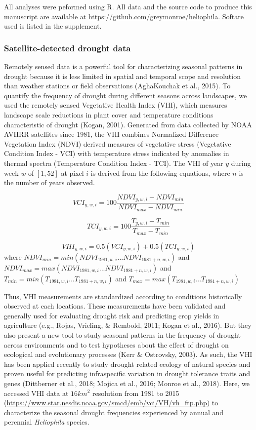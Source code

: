 \documentclass[man,floatsintext]{apa6}
\theoremstyle{definition}
\theoremstyle{definition}
\theoremstyle{definition}
\theoremstyle{remark}
\begin{document}
All analyses were peformed using R. All data and the source code to
produce this manuscript are available at
\url{https://github.com/greymonroe/heliophila}. Softare used is listed
in the supplement.

\hypertarget{satellite-detected-drought-data}{%
\subsubsection{Satellite-detected drought
data}\label{satellite-detected-drought-data}}

Remotely sensed data is a powerful tool for characterizing seasonal
patterns in drought because it is less limited in spatial and temporal
scope and resolution than weather stations or field observations
(AghaKouchak et al., 2015). To quantify the frequency of drought during
different seasons across landscapes, we used the remotely sensed
Vegetative Health Index (VHI), which measures landscape scale reductions
in plant cover and temperature conditions characteristic of drought
(Kogan, 2001). Generated from data collected by NOAA AVHRR satellites
since 1981, the VHI combines Normalized Difference Vegetation Index
(NDVI) derived measures of vegetative stress (Vegetative Condition Index
- VCI) with temperature stress indicated by anomalies in thermal spectra
(Temperature Condition Index - TCI). The VHI of year \(y\) during week
\(w\) of \([1,52]\) at pixel \(i\) is derived from the following
equations, where \(n\) is the number of years observed.

\[VCI_{y,w,i} = 100\frac{NDVI_{y,w,i} - NDVI_{min}}{NDVI_{max} - NDVI_{min}}\]

\[TCI_{y,w,i} = 100\frac{T_{y,w,i} - T_{min}}{T_{max} - T_{min}}\]

\[VHI_{y,w,i} = 0.5(VCI_{y,w,i}) + 0.5(TCI_{y,w,i})\] where
\(NDVI_{min} = min(NDVI_{1981,w,i}...NDVI_{1981+n,w,i})\) and
\(NDVI_{max} = max(NDVI_{1981,w,i}...NDVI_{1981+n,w,i})\) and
\(T_{min} = min(T_{1981,w,i}...T_{1981+n,w,i})\) and
\(T_{max} = max(T_{1981,w,i}...T_{1981+n,w,i})\)

Thus, VHI measurements are standardized according to conditions
historically observed at each locations. These measurements have been
validated and generally used for evaluating drought risk and predicting
crop yields in agriculture (e.g., Rojas, Vrieling, \& Rembold, 2011;
Kogan et al., 2016). But they also present a new tool to study seasonal
patterns in the frequency of drought across environments and to test
hypotheses about the effect of drought on ecological and evolutionary
processes (Kerr \& Ostrovsky, 2003). As such, the VHI has been applied
recently to study drought related ecology of natural species and proven
useful for predicting infraspecific variation in drought tolerance
traits and genes (Dittberner et al., 2018; Mojica et al., 2016; Monroe
et al., 2018). Here, we accessed VHI data at \(16km^2\) resolution from
1981 to 2015
(\url{https://www.star.nesdis.noaa.gov/smcd/emb/vci/VH/vh_ftp.php}) to
characterize the seasonal drought frequencies experienced by annual and
perennial \emph{Heliophila} species.
\end{document}
